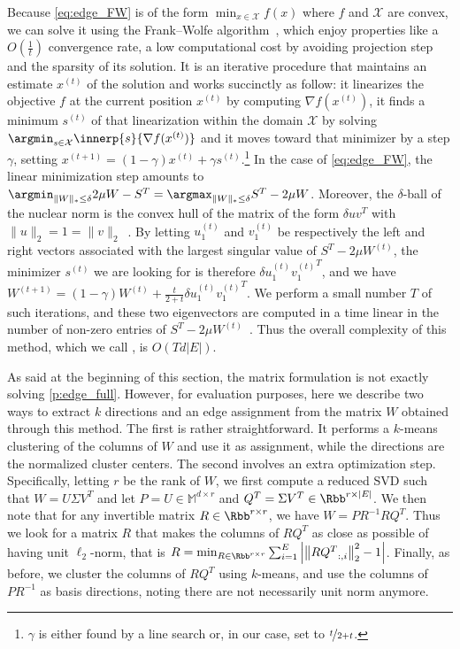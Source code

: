 Because \eqref{eq:edge_FW} is of the form $\min_{x\in \mathcal{X}} f(x)$ where $f$ and $\mathcal{X}$
are convex, we can solve it using the Frank--Wolfe algorithm~\autocites{FrankWolfe56}{Jaggi2013a},
which enjoy properties like a $O(\frac{1}{t})$ convergence rate, a low computational cost by avoiding
projection step and the sparsity of its solution. It is an iterative procedure that maintains an estimate
$x^{(t)}$ of the solution and works succinctly as follow: it linearizes the objective $f$ at the
current position $x^{(t)}$ by computing $\nabla f(x^{(t)})$, it finds a minimum $s^{(t)}$ of that
linearization within the domain $\mathcal{X}$ by solving $\argmin_{s\in \mathcal{X}}
\innerp{s}{\nabla f(x^{(t)})}$ and it moves toward that minimizer by a step $\gamma$, setting
$x^{(t+1)} = (1-\gamma) x^{(t)} + \gamma s^{(t)}$.\footnote{$\gamma$ is either found by a line search or,
in our case, set to $\nicefrac{t}{2+t}$.} In the case of \eqref{eq:edge_FW}, the linear minimization step amounts
to $\argmin_{\|W\|_* \leq \delta} 2\mu W - S^T = \argmax_{\|W\|_* \leq \delta} S^T - 2\mu W$.
Moreover, the $\delta$-ball of the nuclear norm is the convex hull of the matrix of the form $\delta
u v^T$ with $\|u\|_2 = 1 = \|v\|_2$~\autocite{Jaggi2013a}. By letting $u_1^{(t)}$ and $v_1^{(t)}$ be
respectively the left and right vectors associated with the largest singular value of $S^T - 2\mu
W^{(t)}$, the minimizer $s^{(t)}$ we are looking for is therefore $\delta u_1^{(t)} {v_1^{(t)}}^T$,
and we have $W^{(t+1)} = (1-\gamma) W^{(t)} + \frac{t}{2+t} \delta u_1^{(t)} {v_1^{(t)}}^T$. We
perform a small number $T$ of such iterations, and these two eigenvectors are computed in a
time linear in the number of non-zero entries of $S^T - 2\mu W^{(t)}$~\autocite{topEigenvalue92}.
Thus the overall complexity of this method, which we call \fwa{}, is $O(Td|E|)$.

As said at the beginning of this section, the matrix formulation is not exactly solving
\autoref{p:edge_full}. However, for evaluation purposes, here we describe two ways to extract $k$
directions and an edge assignment from the matrix $W$ obtained through this \fwa{} method. The first
is rather straightforward. It performs a $k$-means clustering of the columns of $W$ and use it as
assignment, while the directions are the normalized cluster centers. The second involves an extra
optimization step. Specifically, letting $r$ be the rank of $W$, we first compute a reduced SVD such
that $W = U \Sigma V^T$ and let $P = U \in \mathbb{M}^{d\times r}$ and $Q^T = \Sigma V^T \in \Rbb^{r
\times |E|}$. We then note that for any invertible matrix $R \in \Rbb^{r \times r}$, we have $W =
PR^{-1} RQ^T$. Thus we look for a matrix $R$ that makes the columns of $RQ^T$ as close as possible
of having unit $\ell_2$-norm, that is $R = \min_{R \in \Rbb^{r \times r}} \sum_{i=1}^E \left| \left\|
{RQ^T}_{:,i} \right\|_2^2 - 1 \right|$. Finally, as before,  we cluster the columns of $RQ^T$ using
$k$-means, and use the columns of $PR^{-1}$ as basis directions, noting there are not
necessarily unit norm anymore.

